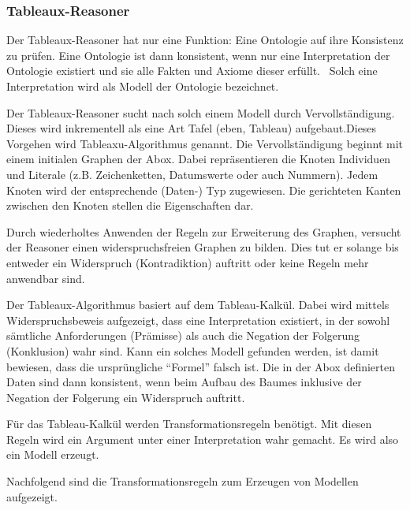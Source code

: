 \subsubsection{Tableaux-Reasoner}
\label{ssubsection:inferenz_pellet_tableaux}
Der Tableaux-Reasoner hat nur eine Funktion: Eine Ontologie auf ihre Konsistenz zu prüfen. Eine Ontologie ist dann konsistent, wenn nur eine Interpretation der Ontologie existiert und sie alle Fakten und Axiome dieser erfüllt.~\cite{w3owlsemantics} Solch eine Interpretation wird als Modell der Ontologie bezeichnet.

Der Tableaux-Reasoner sucht nach solch einem Modell durch Vervollständigung. Dieses wird inkrementell als eine Art Tafel (eben, Tableau) aufgebaut.Dieses Vorgehen wird Tableaxu-Algorithmus genannt. Die Vervollständigung beginnt mit einem initialen Graphen der Abox. Dabei repräsentieren die Knoten Individuen und Literale (z.B. Zeichenketten, Datumswerte oder auch Nummern). Jedem Knoten wird der entsprechende (Daten-) Typ zugewiesen. Die gerichteten Kanten zwischen den Knoten stellen die Eigenschaften dar. %


Durch wiederholtes Anwenden der Regeln zur Erweiterung des Graphen, versucht der Reasoner einen widerspruchsfreien Graphen zu bilden. Dies tut er solange bis entweder ein Widerspruch (Kontradiktion) auftritt oder keine Regeln mehr anwendbar sind.

Der Tableaux-Algorithmus basiert auf dem Tableau-Kalkül. Dabei wird mittels Widerspruchsbeweis aufgezeigt, dass eine Interpretation existiert, in der sowohl sämtliche Anforderungen (Prämisse) als auch die Negation der Folgerung (Konklusion) wahr sind. Kann ein solches Modell gefunden werden, ist damit bewiesen, dass die ursprüngliche ``Formel'' falsch ist. Die in der Abox definierten Daten sind dann konsistent, wenn beim Aufbau des Baumes inklusive der Negation der Folgerung ein Widerspruch auftritt.~\cite{baumkalkuel}

Für das Tableau-Kalkül werden Transformationsregeln benötigt. Mit diesen Regeln wird ein Argument unter einer Interpretation wahr gemacht. Es wird also ein Modell erzeugt.\cite{baumkalkuel}

Nachfolgend sind die Transformationsregeln zum Erzeugen von Modellen aufgezeigt.

